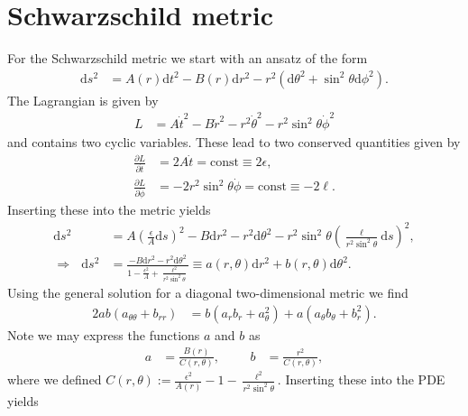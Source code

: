 \documentclass[english, parskip=full]{scrartcl}
\newcommand{\kla}{}
\newcommand{\tecxt}{}
\begin{document}
\section{Schwarzschild metric}
For the Schwarzschild metric we start with an ansatz of the form
\begin{align}
\tecxt\text{d}s^2 &= A(r) \tecxt\text{d}t^2 - B(r) \tecxt\text{d}r^2 - r^2 \kla\left( \tecxt\text{d}\theta^2 + \sin^2\theta\tecxt\text{d}\phi^2 \right).
\end{align}
The Lagrangian is given by
\begin{align}
L &= A\dot{t}^2 - B\dot{r}^2 - r^2\dot{\theta}^2 - r^2\sin^2\theta \dot{\phi}^2
\end{align}
and contains two cyclic variables.
These lead to two conserved quantities given by
\begin{align}
\frac{\partial L}{\partial \dot{t}} &= 2A\dot{t} = \tecxt\text{const} \equiv 2\epsilon,\\
\frac{\partial L}{\partial \dot{\phi}} &= -2r^2\sin^2\theta\dot{\phi} = \tecxt\text{const} \equiv -2\ell.
\end{align}
Inserting these into the metric yields
\begin{align}
\tecxt\text{d}s^2 &= A \kla\left( \frac{\epsilon}{A} \tecxt\text{d}s \right)^2 - B\tecxt\text{d}r^2 - r^2\tecxt\text{d}\theta^2 - r^2\sin^2\theta \kla\left( \frac{\ell}{r^2\sin^2\theta} \tecxt\text{d}s \right)^2,\\
\Rightarrow\ \ \ \tecxt\text{d}s^2 &= \frac{-B\tecxt\text{d}r^2 - r^2\tecxt\text{d}\theta^2}{1 - \frac{\epsilon^2}{A} + \frac{\ell^2}{r^2\sin^2\theta}} \equiv a(r,\theta)\tecxt\text{d}r^2 + b(r,\theta)\tecxt\text{d}\theta^2.
\end{align}
Using the general solution for a diagonal two-dimensional metric we find
\begin{align}
2ab(a_{\theta\theta} + b_{rr}) &= b (a_rb_r + a_\theta^2) + a(a_\theta b_\theta + b_r^2).
\end{align}
Note we may express the functions $a$ and $b$ as
\begin{align}
a &= \frac{B(r)}{C(r,\theta)}, &&& b &= \frac{r^2}{C(r,\theta)},
\end{align}
where we defined $C(r,\theta) := \frac{\epsilon^2}{A(r)} - 1 - \frac{\ell^2}{r^2\sin^2\theta}$.
Inserting these into the PDE yields
\end{document}
